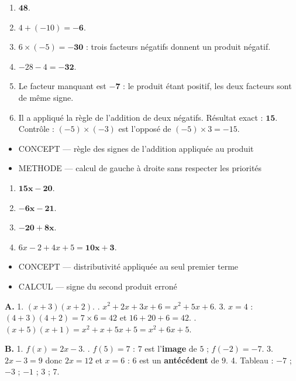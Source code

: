 \documentclass[10pt,a4paper]{article}
\begin{document}
\begin{enumerate}
\item $\mathbf{48}$.
\item $4 + (-10) = \mathbf{-6}$.
\item $6\times(-5)=\mathbf{-30}$ : trois facteurs négatifs donnent un produit négatif.
\item $-28 - 4 = \mathbf{-32}$.
\item Le facteur manquant est $\mathbf{-7}$ : le produit étant positif, les deux facteurs sont de même signe.
\item Il a appliqué la règle de l'addition de deux négatifs. Résultat exact : $\mathbf{15}$. Contrôle : $(-5)\times(-3)$ est l'opposé de $(-5)\times 3=-15$.
\end{enumerate}
\begin{itemize}
\item \textsc{CONCEPT} --- règle des signes de l'addition appliquée au produit
\item \textsc{METHODE} --- calcul de gauche à droite sans respecter les priorités
\end{itemize}
\begin{enumerate}
\item $\mathbf{15x-20}$.
\item $\mathbf{-6x-21}$.
\item $\mathbf{-20+8x}$.
\item $6x-2+4x+5=\mathbf{10x+3}$.
\end{enumerate}
\begin{itemize}
\item \textsc{CONCEPT} --- distributivité appliquée au seul premier terme
\item \textsc{CALCUL} --- signe du second produit erroné
\end{itemize}

\textbf{A.} 1. $(x+3)(x+2)$. . $x^2 + 2x + 3x + 6 = x^2 + 5x + 6$.
3. $x=4$ : $(4+3)(4+2)=7\times 6=42$ et $16+20+6=42$. . $(x+5)(x+1)=x^2+x+5x+5=x^2+6x+5$.

\textbf{B.} 1. $f(x)=2x-3$. . $f(5)=7$ : $7$ est l'\textbf{image} de $5$ ; $f(-2)=-7$.
3. $2x-3=9$ donc $2x=12$ et $x=6$ : $6$ est un \textbf{antécédent} de $9$.
4. Tableau : $-7$ ; $-3$ ; $-1$ ; $3$ ; $7$.
\end{document}
